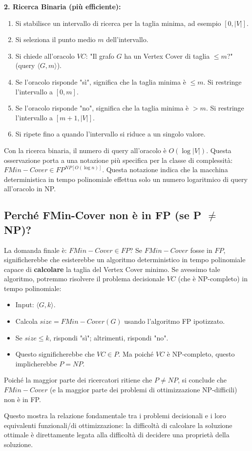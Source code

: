 \documentclass[a4paper]{article}
\begin{document}
\textbf{2. Ricerca Binaria (più efficiente):}
\begin{enumerate}
    \item Si stabilisce un intervallo di ricerca per la taglia minima, ad esempio $[0, |V|]$.
    \item Si seleziona il punto medio $m$ dell'intervallo.
    \item Si chiede all'oracolo $VC$: "Il grafo $G$ ha un Vertex Cover di taglia $\le m$?" (query $\langle G, m \rangle$).
    \item Se l'oracolo risponde "sì", significa che la taglia minima è $\le m$. Si restringe l'intervallo a $[0, m]$.
    \item Se l'oracolo risponde "no", significa che la taglia minima è $> m$. Si restringe l'intervallo a $[m+1, |V|]$.
    \item Si ripete fino a quando l'intervallo si riduce a un singolo valore.
\end{enumerate}
Con la ricerca binaria, il numero di query all'oracolo è $O(\log |V|)$.
Questa osservazione porta a una notazione più specifica per la classe di complessità:
$FMin-Cover \in FP^{NP[O(\log n)]}$. Questa notazione indica che la macchina deterministica in tempo polinomiale effettua solo un numero logaritmico di query all'oracolo in NP.

\subsection{Perché FMin-Cover non è in FP (se P $\neq$ NP)?}
La domanda finale è: $FMin-Cover \in FP$?
Se $FMin-Cover$ fosse in $FP$, significherebbe che esisterebbe un algoritmo deterministico in tempo polinomiale capace di \textbf{calcolare} la taglia del Vertex Cover minimo.
Se avessimo tale algoritmo, potremmo risolvere il problema decisionale $VC$ (che è NP-completo) in tempo polinomiale:
\begin{itemize}
    \item Input: $\langle G, k \rangle$.
    \item Calcola $size = FMin-Cover(G)$ usando l'algoritmo FP ipotizzato.
    \item Se $size \le k$, rispondi "sì"; altrimenti, rispondi "no".
\item Questo significherebbe che $VC \in P$. Ma poiché $VC$ è NP-completo, questo implicherebbe $P=NP$.
\end{itemize}
Poiché la maggior parte dei ricercatori ritiene che $P \neq NP$, si conclude che $FMin-Cover$ (e la maggior parte dei problemi di ottimizzazione NP-difficili) non è in FP.

Questo mostra la relazione fondamentale tra i problemi decisionali e i loro equivalenti funzionali/di ottimizzazione: la difficoltà di calcolare la soluzione ottimale è direttamente legata alla difficoltà di decidere una proprietà della soluzione.
\end{document}
